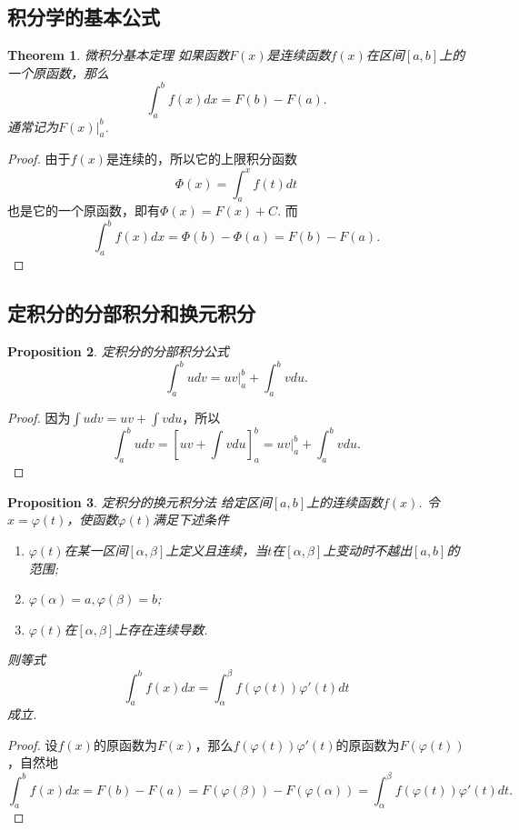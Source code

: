 \documentclass{article}
\newtheorem{theorem}{Theorem}[section]
\newtheorem{proposition}[theorem]{Proposition}
\begin{document}
\subsection{积分学的基本公式}

\begin{theorem}
\rm {\color{red} 微积分基本定理} 如果函数$F(x)$是连续函数$f(x)$在区间$[a,b]$上的一个原函数，那么
$$
\int_a^b f(x)dx = F(b)-F(a).
$$
通常记为$F(x)\rvert_a^b$.
\end{theorem}

\begin{proof}
由于$f(x)$是连续的，所以它的上限积分函数
$$
\Phi(x) =\int_a^x f(t)dt
$$
也是它的一个原函数，即有$\Phi(x) = F(x)+C$. 而
$$
\int_a^b f(x)dx  = \Phi(b) - \Phi(a) = F(b)-F(a).
$$
\end{proof}

\subsection{定积分的分部积分和换元积分}
\begin{proposition}
\rm {\color{red}定积分的分部积分公式}
$$
\int_a^b udv = uv\rvert_a^b + \int_a^b vd u.  
$$
\end{proposition}

\begin{proof}
因为$\int udv = uv + \int vdu$，所以
$$
\int_a^b udv = \left[ uv + \int vdu \right]_a^b = uv\rvert_a^b + \int_a^b vdu.
$$
\end{proof}


\begin{proposition}
\rm {\color{red}定积分的换元积分法}
给定区间$[a,b]$上的连续函数$f(x)$. 令$x = \varphi(t)$，使函数$\varphi(t)$满足下述条件
\begin{enumerate}
	\item $\varphi(t)$在某一区间$[\alpha,\beta]$上定义且连续，当$t$在$[\alpha,\beta]$上变动时不越出$[a,b]$的范围;
	\item $\varphi(\alpha)=a,\varphi(\beta)=b$;
	\item $\varphi(t)$在$[\alpha,\beta]$上存在连续导数.
\end{enumerate}
则等式
$$
\int_a^b f(x)dx = \int_\alpha^{\beta} f(\varphi(t))\varphi'(t)dt
$$
成立.
\end{proposition}

\begin{proof}
设$f(x)$的原函数为$F(x)$，那么$f(\varphi(t))\varphi'(t)$的原函数为$F(\varphi(t))$，自然地
$$
\int_a^b f(x)dx = F(b)-F(a) = F(\varphi(\beta))-F(\varphi(\alpha)) = \int_\alpha^{\beta} f(\varphi(t))\varphi'(t)dt.
$$
\end{proof}
\end{document}

